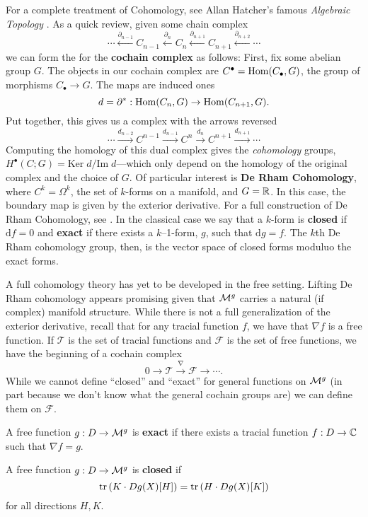 For a complete treatment of Cohomology, see Allan Hatcher's famous
\emph{Algebraic Topology} \cite{hatcherAlgebraic2002}. As a quick review, given
some chain complex
\[
  \cdots
  \xleftarrow{\partial_{n-1}}
  C_{n-1}
  \xleftarrow{\partial_{n}}
  C_{n}
  \xleftarrow{\partial_{n+1}}
  C_{n+1}
  \xleftarrow{\partial_{n+2}}
  \cdots
\]
we can form the for the \textbf{cochain complex} as follows: First, fix some
abelian group \(G\). The objects in our cochain complex are
\(C^\bullet = \operatorname{Hom} (C_\bullet, G)\), the group of morphisms \(C_\bullet \to G\).
The maps are induced ones
\[
  d = \partial^* : \operatorname{Hom}(C_n,G) \to \operatorname{Hom}(C_{n+1},G).
\]
Put together, this gives us a complex with the arrows reversed
\[
  \cdots
  \xrightarrow{d_{n-2}}
  C^{n-1}
  \xrightarrow{d_{n-1}}
  C^{n}
  \xrightarrow{d_{n}}
  C^{n+1}
  \xrightarrow{d_{n+1}}
  \cdots
\]
Computing the homology of this dual complex gives the \emph{cohomology}
groups, \(H^\bullet (C; G)= \textrm{Ker}\;  d / \textrm{Im}\; d\)---which only
depend on the homology of the original complex and the choice of \(G\). Of
particular interest is \textbf{De Rham Cohomology}, where \(C^k = \Omega^k\), the
set of \(k\)-forms on a manifold, and \(G=\mathbb{R} \). In this case, the boundary map
is given by the exterior derivative. For a full construction of De Rham
Cohomology, see \cite{leeIntroduction2013}. In the classical case we say that a
\(k\)-form is \textbf{closed} if \(\text{d} f =0\) and \textbf{exact} if there
exists a \(k\)--1-form, \(g\), such that \(\text{d} g=f\). The \(k\)th De Rham
cohomology group, then, is the vector space of closed forms moduluo the exact
forms.

A full cohomology theory has yet to be developed in the free setting. Lifting
De Rham cohomology appears promising given that \(\mathcal{M}^{g} \) carries
a natural (if complex) manifold structure. While there is not a full
generalization of the exterior derivative, recall that for any tracial function \(f\),
we have that \(\nabla f\) is a free function. If \(\mathcal{T}\) is the set of
tracial functions and \(\mathcal{F}\) is the set of free functions, we have the
beginning of a cochain complex
\[
  0 \rightarrow \mathcal{T} \xrightarrow{\nabla} \mathcal{F} \rightarrow \cdots.
\]
While we cannot define ``closed'' and ``exact'' for general functions on
\(\mathcal{M}^{g} \) (in part because we don't know what the general cochain groups are)
we can define them on \(\mathcal{F}\).
\begin{definition}[Exact]%
\label{def:exact}
  A free function \(g: D \to \mathcal{M}^{g} \) is \textbf{exact} if there exists a
  tracial function \(f: D \to \mathbb{C} \)
  such that \(\nabla f = g\).
\end{definition}
\begin{definition}[Closed]%
\label{def:closed}
  A free function \(g: D \to \mathcal{M}^{g} \) is \textbf{closed} if
  \[
    \operatorname{tr} \left( K \cdot Dg(X)[H] \right) = \operatorname{tr} \left( H \cdot Dg(X)[K] \right)
  \]
  for all directions \(H,K\).
\end{definition}


